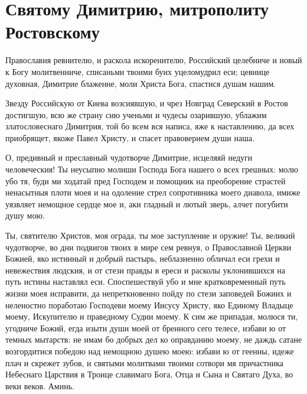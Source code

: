 \mychapterending


\section{Святому Димитрию, митрополиту Ростовскому}\begin{mymulticols}


Православия ревнителю, и раскола искоренителю, Российский целебниче и новый к Богу молитвенниче, списаньми твоими буих уцеломудрил еси; цевнице духовная, Димитрие блаженне, моли Христа Бога, спастися душам нашим.


Звезду Российскую от Киева возсиявшую, и чрез Новград Северский в Ростов достигшую, всю же страну сию ученьми и чудесы озарившую, ублажим златословеснаго Димитрия, той бо всем вся написа, яже к наставлению, да всех приобрящет, якоже Павел Христу, и спасет правоверием души наша.


О, предивный и преславный чудотворче Димитрие, исцеляяй недуги человеческия! Ты неусыпно молиши Господа Бога нашего о всех грешных: молю убо тя, буди ми ходатай пред Господем и помощник на преоборение страстей ненасытныя плоти моея и на одоление стрел сопротивника моего диавола, имиже уязвляет немощное сердце мое и, аки гладный и лютый зверь, алчет погубити душу мою. 

Ты, святителю Христов, моя ограда, ты мое заступление и оружие! Ты, великий чудотворче, во дни подвигов твоих в мире сем ревнуя, о Православной Церкви Божией, яко истинный и добрый пастырь, неблазненно обличал еси грехи и невежествия людския, и от стези правды в ереси и расколы уклонившихся на путь истины наставлял еси. Споспешествуй убо и мне кратковременный путь жизни моея исправити, да непреткновенно пойду по стези заповедей Божиих и неленостно поработаю Господеви моему Иисусу Христу, яко Единому Владыце моему, Искупителю и праведному Судии моему. К сим же припадая, молюся ти, угодниче Божий, егда изыти души моей от бренного сего телесе, избави ю от темных мытарств: не имам бо добрых дел ко оправданию моему, не даждь сатане возгордитися победою над немощною душею моею: избави ю от геенны, идеже плач и скрежет зубов, и святыми молитвами твоими сотвори мя причастника Небеснаго Царствия в Троице славимаго Бога, Отца и Сына и Святаго Духа, во веки веков. Аминь.

\end{mymulticols}

